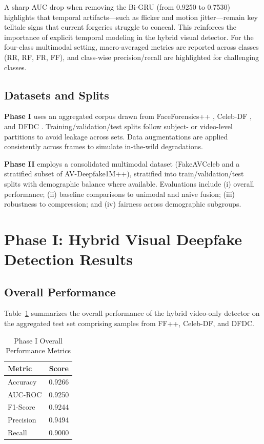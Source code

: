 A sharp AUC drop when removing the Bi-GRU (from 0.9250 to 0.7530) highlights that temporal artifacts—such as flicker and motion jitter—remain key telltale signs that current forgeries struggle to conceal. This reinforces the importance of explicit temporal modeling in the hybrid visual detector.
For the four-class multimodal setting, macro-averaged metrics are reported across classes (RR, RF, FR, FF), and class-wise precision/recall are highlighted for challenging classes.

\subsection{Datasets and Splits}
\textbf{Phase I} uses an aggregated corpus drawn from FaceForensics++ \cite{rossler2019faceforensics}, Celeb-DF \cite{li2020celebdf}, and DFDC \cite{dolhansky2020dfdc}. Training/validation/test splits follow subject- or video-level partitions to avoid leakage across sets. Data augmentations are applied consistently across frames to simulate in-the-wild degradations.

\textbf{Phase II} employs a consolidated multimodal dataset (FakeAVCeleb and a stratified subset of AV-Deepfake1M++), stratified into train/validation/test splits with demographic balance where available. Evaluations include (i) overall performance; (ii) baseline comparisons to unimodal and naive fusion; (iii) robustness to compression; and (iv) fairness across demographic subgroups.

\section{Phase I: Hybrid Visual Deepfake Detection Results}
\subsection{Overall Performance}
Table~\ref{tab:phase1_overall} summarizes the overall performance of the hybrid video-only detector on the aggregated test set comprising samples from FF++, Celeb-DF, and DFDC.

\begin{table}[!htbp]
\centering
\caption{Phase I Overall Performance Metrics}
\label{tab:phase1_overall}
\begin{tabular}{l c}
\toprule
Metric & Score \\
\midrule
Accuracy & 0.9266 \\
AUC-ROC & 0.9250 \\
F1-Score & 0.9244 \\
Precision & 0.9494 \\
Recall & 0.9000 \\
\bottomrule
\end{tabular}
\end{table}


